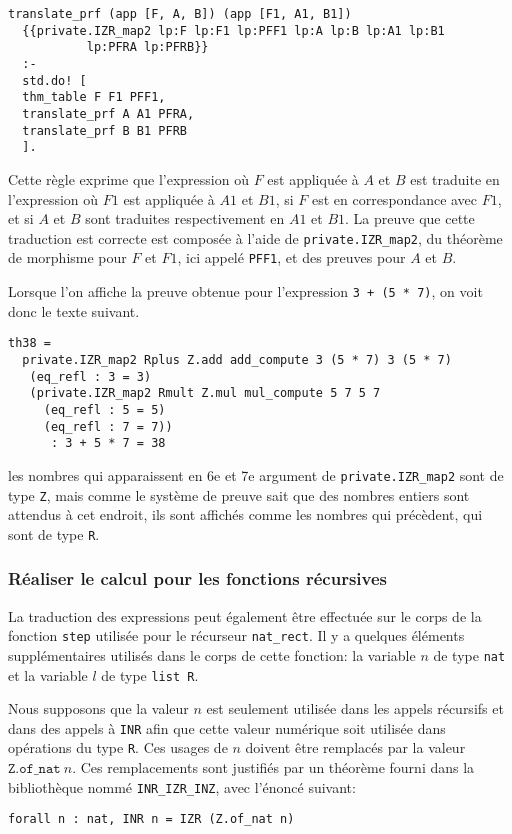 \documentclass{jflart}
\begin{document}
\begin{verbatim}
translate_prf (app [F, A, B]) (app [F1, A1, B1])
  {{private.IZR_map2 lp:F lp:F1 lp:PFF1 lp:A lp:B lp:A1 lp:B1
           lp:PFRA lp:PFRB}}
  :-
  std.do! [
  thm_table F F1 PFF1,
  translate_prf A A1 PFRA,
  translate_prf B B1 PFRB
  ].
\end{verbatim}

Cette règle exprime que l'expression où \(F\) est appliquée à \(A\) et
\(B\) est traduite en l'expression où \(F1\) est appliquée à \(A1\) et
\(B1\), si \(F\) est en correspondance avec \(F1\), et si \(A\) et
\(B\) sont traduites respectivement en \(A1\) et \(B1\).  La preuve
que cette traduction est correcte est composée à l'aide de
 \texttt{private.IZR\_map2}, du théorème de morphisme pour \(F\) et \(F1\),
ici appelé \texttt{PFF1}, et des preuves pour \(A\) et \(B\).

Lorsque l'on affiche la preuve obtenue pour l'expression \texttt{3 + (5 *
  7)}, on voit donc le texte suivant.
\begin{verbatim}
th38 =
  private.IZR_map2 Rplus Z.add add_compute 3 (5 * 7) 3 (5 * 7)
   (eq_refl : 3 = 3)
   (private.IZR_map2 Rmult Z.mul mul_compute 5 7 5 7 
     (eq_refl : 5 = 5)
     (eq_refl : 7 = 7))
      : 3 + 5 * 7 = 38
\end{verbatim}
les nombres qui apparaissent en 6e et 7e argument de
\texttt{private.IZR\_map2} sont de type \texttt{Z}, mais comme le système de
preuve sait que des nombres entiers sont attendus à cet endroit, ils
sont affichés comme les nombres qui précèdent, qui sont de type
\texttt{R}.

\subsubsection{Réaliser le calcul pour les fonctions récursives}
La traduction des expressions peut également être effectuée sur le
corps de la fonction \texttt{step} utilisée pour le récurseur
\texttt{nat\_rect}.  Il y a quelques éléments supplémentaires utilisés
dans le corps de cette fonction: la variable \(n\) de type \texttt{nat}
et la variable \(l\) de type \texttt{list R}.  

Nous supposons que la valeur \(n\) est seulement utilisée dans les
appels récursifs et dans des
appels à \texttt{INR} afin que cette valeur numérique soit utilisée dans
opérations du type \texttt{R}.  Ces usages de \(n\) doivent être
remplacés par la valeur \(\texttt{Z.of\_nat}~n\).  Ces remplacements sont
justifiés par un théorème fourni dans la bibliothèque nommé
\texttt{INR\_IZR\_INZ}, avec l'énoncé suivant:
\begin{verbatim}
forall n : nat, INR n = IZR (Z.of_nat n)
\end{verbatim}
\end{document}
